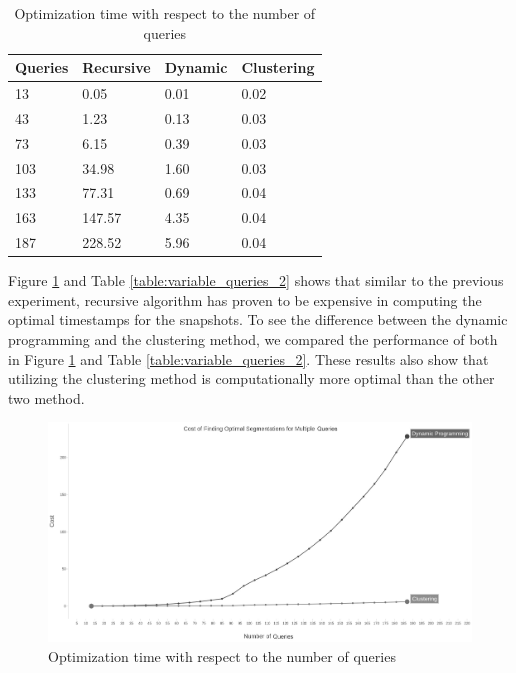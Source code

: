 			\begin {center}
			\begin{table}
				\centering
				\caption{Optimization time with respect to the number of queries}
				\label {table:variable_queries}
				\begin{tabular}{p{2cm}p{3cm}p{3cm}p{3cm}}
					\hline
					Queries & Recursive      & Dynamic  & Clustering \\ \hline
					13 & 0.05   & 0.01  & 0.02  \\  
					43 & 1.23   & 0.13  & 0.03  \\
					73 & 6.15   & 0.39  & 0.03  \\
					103 & 34.98 & 1.60  & 0.03  \\
					133 & 77.31 & 0.69  & 0.04 \\
					163 & 147.57 & 4.35  & 0.04  \\
					187 & 228.52 & 5.96  & 0.04  \\\hline
				\end{tabular}
			\end{table}
			\end{center}

			Figure \ref{fig:variable_queries_2} and Table \ref{table:variable_queries_2} shows that similar to the previous experiment, recursive algorithm has proven to be expensive in computing the optimal timestamps for the snapshots. To see the difference between the dynamic programming and the clustering method, we compared the performance of both in Figure \ref{fig:variable_queries_2} and Table \ref{table:variable_queries_2}. These results also show that utilizing the clustering method is computationally more optimal than the other two method.

			\begin{figure}
				\centering
				\includegraphics[width=\textwidth]{figs/multi_query_2.jpg}
				\caption{Optimization time with respect to the number of queries}
				\label{fig:variable_queries_2}
			\end{figure} 


